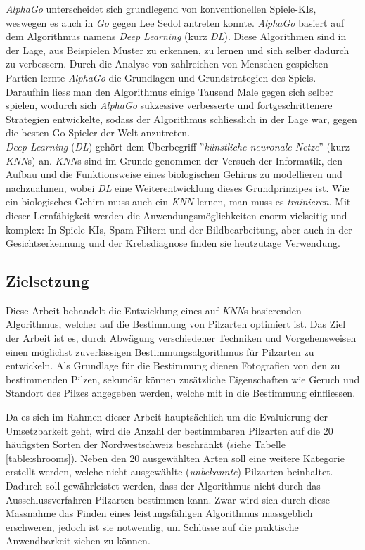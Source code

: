 \vspace{0.5cm}

\textit{AlphaGo} unterscheidet sich grundlegend von konventionellen Spiele-KIs, weswegen es auch in \textit{Go} gegen Lee Sedol antreten konnte. \textit{AlphaGo} basiert auf dem Algorithmus namens \textit{Deep Learning} (kurz \textit{DL}). Diese Algorithmen sind in der Lage, aus Beispielen Muster zu erkennen, zu lernen und sich selber dadurch zu verbessern. Durch die Analyse von zahlreichen von Menschen gespielten Partien lernte \textit{AlphaGo} die Grundlagen und Grundstrategien des Spiels. Daraufhin liess man den Algorithmus einige Tausend Male gegen sich selber spielen, wodurch sich \textit{AlphaGo} sukzessive verbesserte und fortgeschrittenere Strategien entwickelte, sodass der Algorithmus schliesslich in der Lage war, gegen die besten Go-Spieler der Welt anzutreten.\\

\textit{Deep Learning} (\textit{DL}) gehört dem Überbegriff ''\textit{künstliche neuronale Netze}'' (kurz \textit{KNN}s) an. \textit{KNN}s sind im Grunde genommen der Versuch der Informatik, den Aufbau und die Funktionsweise eines biologischen Gehirns zu modellieren und nachzuahmen, wobei \textit{DL} eine Weiterentwicklung dieses Grundprinzipes ist. Wie ein biologisches Gehirn muss auch ein \textit{KNN} lernen, man muss es \textit{trainieren}. Mit dieser Lernfähigkeit werden die Anwendungsmöglichkeiten enorm vielseitig und komplex: In Spiele-KIs, Spam-Filtern und der Bildbearbeitung, aber auch in der Gesichtserkennung und der Krebsdiagnose finden sie heutzutage Verwendung. 

\subsection{Zielsetzung}\label{cha:intr:aim}

Diese Arbeit behandelt die Entwicklung eines auf \textit{KNN}s basierenden Algorithmus, welcher auf die Bestimmung von Pilzarten optimiert ist. Das Ziel der Arbeit ist es, durch Abwägung verschiedener Techniken und Vorgehensweisen einen möglichst zuverlässigen Bestimmungsalgorithmus für Pilzarten zu entwickeln. Als Grundlage für die Bestimmung dienen Fotografien von den zu bestimmenden Pilzen, sekundär können zusätzliche Eigenschaften wie Geruch und Standort des Pilzes angegeben werden, welche mit in die Bestimmung einfliessen.

Da es sich im Rahmen dieser Arbeit hauptsächlich um die Evaluierung der Umsetzbarkeit geht, wird die Anzahl der bestimmbaren Pilzarten auf die 20 häufigsten Sorten der Nordwestschweiz beschränkt (siehe Tabelle \ref{table:shrooms}). Neben den 20 ausgewählten Arten soll eine weitere Kategorie erstellt werden, welche nicht ausgewählte (\textit{unbekannte}) Pilzarten beinhaltet. Dadurch soll gewährleistet werden, dass der Algorithmus nicht durch das Ausschlussverfahren Pilzarten bestimmen kann. Zwar wird sich durch diese Massnahme das Finden eines leistungsfähigen Algorithmus massgeblich erschweren, jedoch ist sie notwendig, um Schlüsse auf die praktische Anwendbarkeit ziehen zu können.

